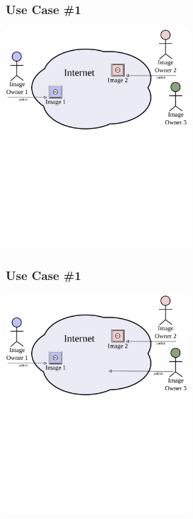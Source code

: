 \documentclass[mathserif,xcolor=dvipsnames,hyperref={bookmarks=true}]{beamer}
\begin{document}
    \begin{frame}[t]
        \frametitle{Use Case \#1}
        \begin{center}
            \includegraphics[width=0.51\textwidth]{../resources/usecases/usecase1/usecase1-step08.pdf}
        \end{center}
    \end{frame}
    \begin{frame}[t]
        \frametitle{Use Case \#1}
        \begin{center}
            \includegraphics[width=0.51\textwidth]{../resources/usecases/usecase1/usecase1-step09.pdf}
        \end{center}
    \end{frame}
\end{document}
